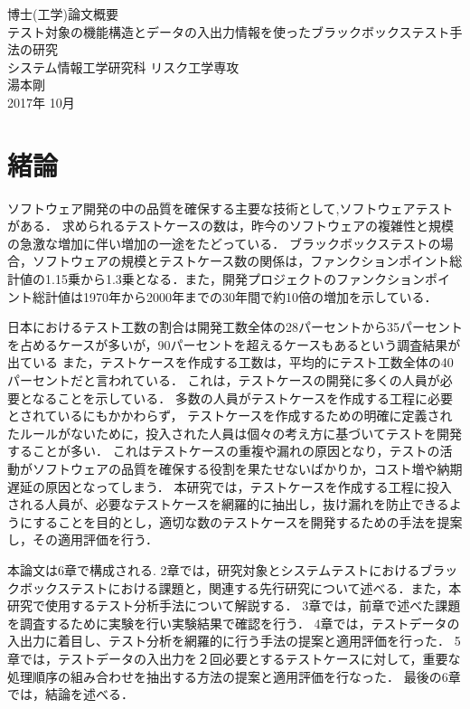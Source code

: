 \documentclass[10pt,a4j]{jarticle}
\begin{document}
\thispagestyle{empty}
\vspace*{2cm}
\begin{center}
\LARGE
博士(工学)論文概要\\[2cm]
テスト対象の機能構造とデータの入出力情報を使ったブラックボックステスト手法の研究\\[8cm]
システム情報工学研究科 リスク工学専攻\\[1cm]
湯本剛 \\[2cm]
2017年 10月
\end{center}

\clearpage
\tableofcontents

\pagebreak \setcounter{page}{1}

\section{緒論} \label{chap:1}
ソフトウェア開発の中の品質を確保する主要な技術として,ソフトウェアテストがある．
求められるテストケースの数は，昨今のソフトウェアの複雑性と規模の急激な増加に伴い増加の一途をたどっている．
ブラックボックステストの場合，ソフトウェアの規模とテストケース数の関係は，ファンクションポイント総計値の1.15乗から1.3乗となる\cite{jones1998estimating}．また，開発プロジェクトのファンクションポイント総計値は1970年から2000年までの30年間で約10倍の増加を示している\cite{longstreet2000}．

日本におけるテスト工数の割合は開発工数全体の28パーセントから35パーセントを占めるケースが多いが，90パーセントを超えるケースもあるという調査結果が出ている\cite{IPA2015}
また，テストケースを作成する工数は，平均的にテスト工数全体の40パーセントだと言われている\cite{van2013tpi}．
これは，テストケースの開発に多くの人員が必要となることを示している．
多数の人員がテストケースを作成する工程に必要とされているにもかかわらず， テストケースを作成するための明確に定義されたルールがないために，投入された人員は個々の考え方に基づいてテストを開発することが多い．
これはテストケースの重複や漏れの原因となり，テストの活動がソフトウェアの品質を確保する役割を果たせないばかりか，コスト増や納期遅延の原因となってしまう．
本研究では，テストケースを作成する工程に投入される人員が、必要なテストケースを網羅的に抽出し，抜け漏れを防止できるようにすることを目的とし，適切な数のテストケースを開発するための手法を提案し，その適用評価を行う．

本論文は6章で構成される. 
2章では，研究対象とシステムテストにおけるブラックボックステストにおける課題と，関連する先行研究について述べる．また，本研究で使用するテスト分析手法について解説する．
3章では，前章で述べた課題を調査するために実験を行い実験結果で確認を行う．
4章では，テストデータの入出力に着目し、テスト分析を網羅的に行う手法の提案と適用評価を行った．
5章では，テストデータの入出力を２回必要とするテストケースに対して，重要な処理順序の組み合わせを抽出する方法の提案と適用評価を行なった．
最後の6章では，結論を述べる．
\end{document}
